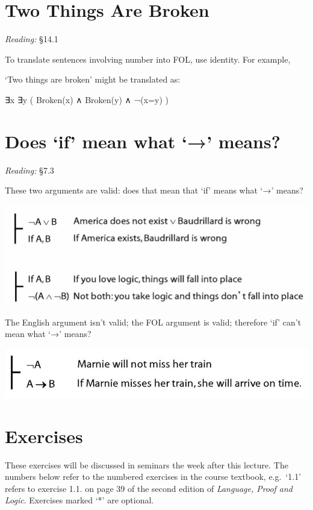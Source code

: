 \documentclass[12pt]{extarticle}
\begin{document}
\begin{multicols*}{3}
 
 
\section{Two Things Are Broken}
 
\emph{Reading:} §14.1
 
To translate sentences involving number into FOL, use identity. For example,
 
`Two things are broken' might be translated as:
 
∃x ∃y ( Broken(x) ∧ Broken(y) ∧ ¬(x=y) )
 
 
 
\section{Does ‘if’ mean what ‘→’ means?}
 
\emph{Reading:} §7.3
 
 
These two arguments are valid: does that mean that `if' means what `→' means?
 
\begin{center}
\includegraphics[scale=0.3]{img/if_is_arrow.png}
\end{center}
 
 
The English argument isn't valid; the FOL argument is valid; therefore `if' can't mean what `→' means?
 
\begin{center}
\includegraphics[scale=0.3]{img/if_aint_arrow.png}
\end{center}
 
\vfill
\begin{minipage}{\columnwidth}
\section{Exercises}
These exercises will be discussed in seminars the week after this lecture.
The numbers below refer to the numbered exercises in the course textbook, e.g.\ `1.1' refers to exercise 1.1. on page 39 of the second edition of \emph{Language, Proof and Logic}. Exercises marked `*' are optional.
 

\end{minipage}
\end{multicols*}
\end{document}
